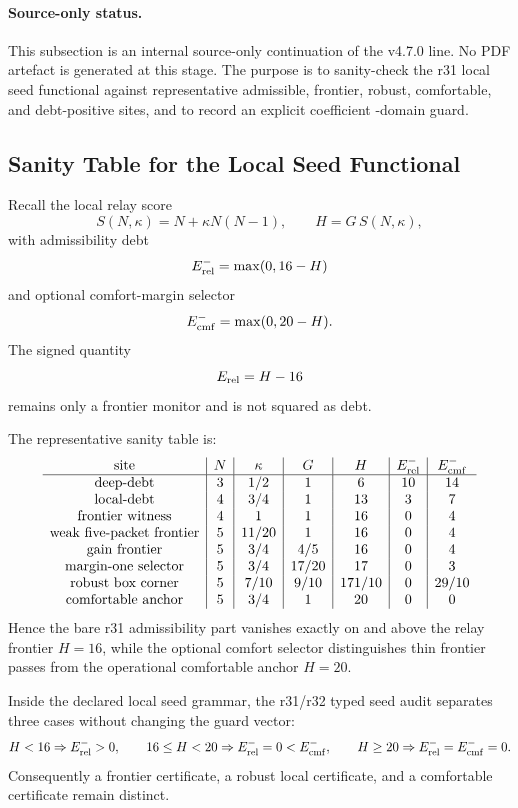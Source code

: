 \paragraph{Source-only status.}
This subsection is an internal source-only continuation of the v4.7.0 line.  No
PDF artefact is generated at this stage.  The purpose is to sanity-check the
r31 local seed functional against representative admissible, frontier, robust,
comfortable, and debt-positive sites, and to record an explicit coefficient
-domain guard.

\subsection{Sanity Table for the Local Seed Functional}
\label{subsec:r32-seed-sanity-table}

Recall the local relay score
\[
S(N,\kappa)=N+\kappa N(N-1),
\qquad
H=G\,S(N,\kappa),
\]
with admissibility debt
\[
E_{\rm rel}^{-}=\max(0,16-H)
\]
and optional comfort-margin selector
\[
E_{\rm cmf}^{-}=\max(0,20-H).
\]
The signed quantity
\[
E_{\rm rel}=H-16
\]
remains only a frontier monitor and is not squared as debt.

The representative sanity table is:
\[
\begin{array}{c|c|c|c|c|c|c}
\text{site} & N & \kappa & G & H & E_{\rm rel}^{-} & E_{\rm cmf}^{-}\\
\hline
\text{deep-debt} & 3 & 1/2 & 1 & 6 & 10 & 14\\
\text{local-debt} & 4 & 3/4 & 1 & 13 & 3 & 7\\
\text{frontier witness} & 4 & 1 & 1 & 16 & 0 & 4\\
\text{weak five-packet frontier} & 5 & 11/20 & 1 & 16 & 0 & 4\\
\text{gain frontier} & 5 & 3/4 & 4/5 & 16 & 0 & 4\\
\text{margin-one selector} & 5 & 3/4 & 17/20 & 17 & 0 & 3\\
\text{robust box corner} & 5 & 7/10 & 9/10 & 171/10 & 0 & 29/10\\
\text{comfortable anchor} & 5 & 3/4 & 1 & 20 & 0 & 0
\end{array}
\]
Hence the bare r31 admissibility part vanishes exactly on and above the relay
frontier \(H=16\), while the optional comfort selector distinguishes thin
frontier passes from the operational comfortable anchor \(H=20\).

\begin{lemma}
\label{lem:r32-local-sanity-separation}
Inside the declared local seed grammar, the r31/r32 typed seed audit separates
three cases without changing the guard vector:
\[
H<16\Rightarrow E_{\rm rel}^{-}>0,
\qquad
16\leq H<20\Rightarrow E_{\rm rel}^{-}=0<E_{\rm cmf}^{-},
\qquad
H\geq20\Rightarrow E_{\rm rel}^{-}=E_{\rm cmf}^{-}=0.
\]
Consequently a frontier certificate, a robust local certificate, and a
comfortable certificate remain distinct.
\end{lemma}

